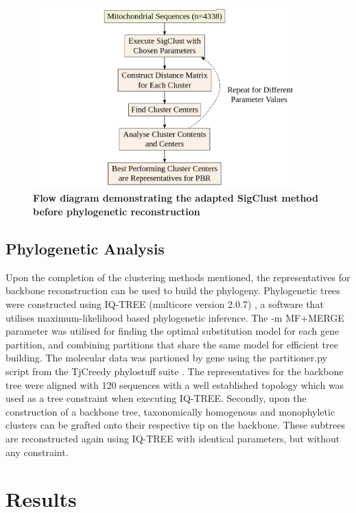 \documentclass[12pt]{article}
\begin{document}
  \begin{figure}[H]
    \centering
    \includegraphics[width=0.9\textwidth]{flowchart.png}
    \captionsetup{margin=0.75cm}
      \caption{\textbf{\small Flow diagram demonstrating the adapted SigClust method before phylogenetic reconstruction}}
  \end{figure}

  \subsection{Phylogenetic Analysis}
  
  Upon the completion of the clustering methods mentioned, the representatives for backbone reconstruction can be used to build the phylogeny. Phylogenetic trees were constructed using IQ-TREE (multicore version 2.0.7) \cite{iqtree}, a software that utilises maximum-likelihood based phylogenetic inference. The -m MF+MERGE parameter was utilised for finding the optimal substitution model for each gene partition, and combining partitions that share the same model for efficient tree building. The molecular data was partioned by gene using the partitioner.py script from the TjCreedy phylostuff suite \cite{Tjcreedy}. The representatives for the backbone tree were aligned with 120 sequences with a well established topology which was used as a tree constraint when executing IQ-TREE. Secondly, upon the construction of a backbone tree, taxonomically homogenous and monophyletic clusters can be grafted onto their respective tip on the backbone. These subtrees are reconstructed again using IQ-TREE with identical parameters, but without any constraint.

  \section{Results}
\end{document}
